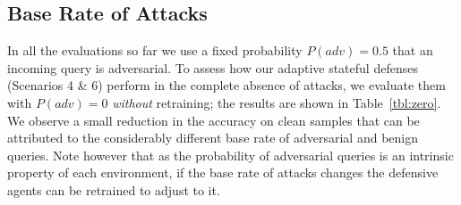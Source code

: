 


\subsection{Base Rate of Attacks}
\label{baserate}

In all the evaluations so far we use a fixed probability $P(adv)=0.5$ that an incoming query is adversarial.
To assess how our adaptive stateful defenses (Scenarios 4 \& 6) perform in the complete absence of attacks, we evaluate them with $P(adv)=0$ \textit{without} retraining; the results are shown in Table~\ref{tbl:zero}.
We observe a small reduction in the accuracy on clean samples that can be attributed to the considerably different base rate of adversarial and benign queries.
Note however that as the probability of adversarial queries is an intrinsic property of each environment, if the base rate of attacks changes the defensive agents can be retrained to adjust to it.

